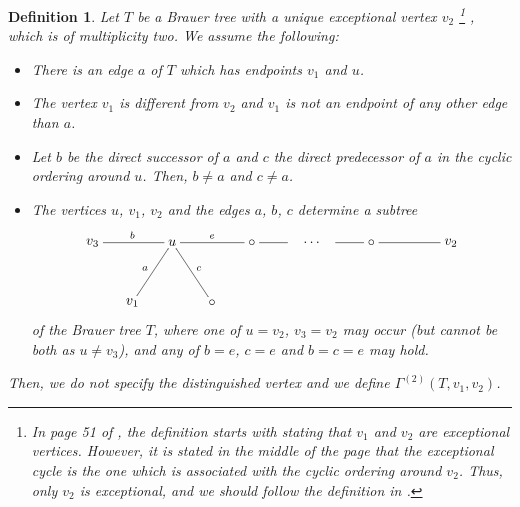 \documentclass[12pt]{amsart}
\newtheorem{definition}[thm]{Definition}
\numberwithin{equation}{thm}
\newcounter{ni}
\begin{document}
\begin{definition}\label{D defn V}
Let $T$ be a Brauer tree with 
a unique exceptional vertex $v_{2}$
\footnote{In page 51 of \cite{BHS}, the definition starts with stating that $v_1$ and $v_2$ are exceptional vertices. 
However, it is stated in the middle of the page that the exceptional cycle is the one which is associated with the cyclic ordering around $v_2$. 
Thus, only $v_2$ is exceptional, and we should follow the definition in \cite{BS}.}
, which is of multiplicity two. 
We assume the following:
\begin{itemize}
\item
There is an edge $a$ of $T$ which has endpoints $v_1$ and $u$.
\item
The vertex $v_1$ is different from $v_2$ and $v_1$ is not an endpoint of any other edge than $a$.
\item
Let $b$ be the direct successor of $a$ and $c$ the direct predecessor of $a$ in the cyclic ordering around $u$. 
Then, $b\ne a$ and $c\ne a$.
\item
The vertices $u$, $v_{1}$, $v_{2}$ and the edges $a$, $b$, $c$ determine a subtree 
\[ 
 \begin{xy}
(0,0)*[o]+{v_{3}}="3",(20,0)*[o]+{u}="u",(10,-15)*[o]+{v_{1}}="1",(30,-15)*[o]+{\circ}="000",(40,0)*[o]+{\circ}="001",(50,0)*[o]+{}="dammy1",
(55,0)*[o]+{\cdots}="cdots",(60,0)*[o]+{}="dammy2",(70,0)*[o]+{\circ}="002",(90,0)*[o]+{v_{2}}="2"
\ar @{-}"3";"u"^{b}
\ar @{-}"1";"u"^{a}
\ar @{-}"000";"u"_{c}
\ar @{-}"u";"001"^{e}
\ar @{-}"001";"dammy1"
\ar @{-}"dammy2";"002"
\ar @{-}"002";"2"
\end{xy}
\]
of the Brauer tree $T$, where one of $u=v_{2}$, $v_{3}=v_{2}$ may occur (but cannot be both as $u\ne v_3$), 
and any of $b=e$, $c=e$ and $b=c=e$ may hold. 
\end{itemize}
Then, we do not specify the distinguished vertex and we define $\Gamma^{(2)}(T,v_{1},v_{2})$.


\end{definition}
\end{document}
